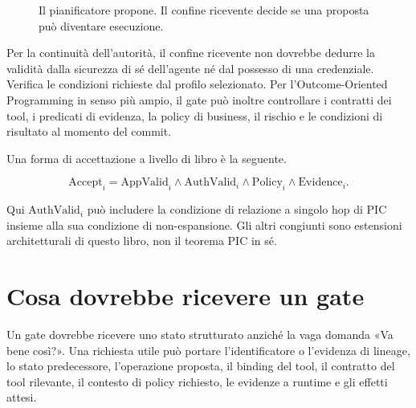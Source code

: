 \documentclass[10pt,oneside,openany]{book}
\begin{document}
\begin{figure}[H]
\centering
{}
\caption{Il pianificatore propone. Il confine ricevente decide se una proposta può diventare esecuzione.}
\end{figure}

Per la continuità dell'autorità, il confine ricevente non dovrebbe dedurre la validità dalla sicurezza di sé dell'agente né dal possesso di una credenziale. Verifica le condizioni richieste dal profilo selezionato. Per l'Outcome-Oriented Programming in senso più ampio, il gate può inoltre controllare i contratti dei tool, i predicati di evidenza, la policy di business, il rischio e le condizioni di risultato al momento del commit.

Una forma di accettazione a livello di libro è la seguente.
\begin{formulabox}
\[
\mathrm{Accept}_i =
\mathrm{AppValid}_i \land
\mathrm{AuthValid}_i \land
\mathrm{Policy}_i \land
\mathrm{Evidence}_i.
\]
\end{formulabox}
Qui $\mathrm{AuthValid}_i$ può includere la condizione di relazione a singolo hop di PIC insieme alla sua condizione di non-espansione. Gli altri congiunti sono estensioni architetturali di questo libro, non il teorema PIC in sé.

\section{Cosa dovrebbe ricevere un gate}
Un gate dovrebbe ricevere uno stato strutturato anziché la vaga domanda «Va bene così?». Una richiesta utile può portare l'identificatore o l'evidenza di lineage, lo stato predecessore, l'operazione proposta, il binding del tool, il contratto del tool rilevante, il contesto di policy richiesto, le evidenze a runtime e gli effetti attesi.
\end{document}
